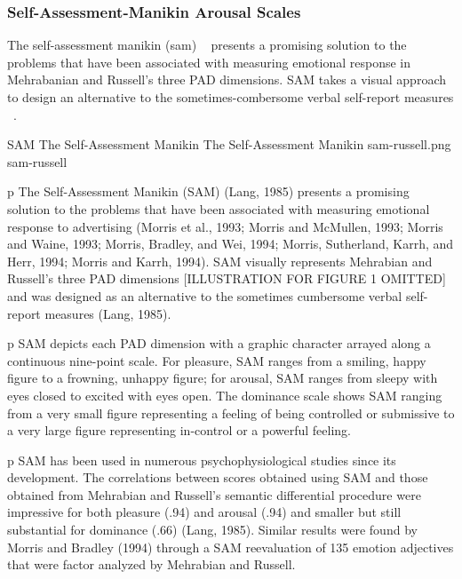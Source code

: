 \documentclass{uofsthesis-cs}
\begin{document}
\subsubsection{Self-Assessment-Manikin Arousal Scales}
The self-assessment manikin (sam) ~\cite{lang1985cognitive} presents a promising solution to the problems that have been associated with measuring emotional response in Mehrabanian and Russell's three PAD dimensions. SAM takes a visual approach to design an alternative to the sometimes-combersome verbal self-report measures ~\cite{lang1985cognitive}.

\img
{SAM The Self-Assessment Manikin}
{The Self-Assessment Manikin}
{sam-russell.png}
{sam-russell}

p The Self-Assessment Manikin (SAM) (Lang, 1985) presents a promising solution to the problems that have been associated with measuring emotional response to advertising (Morris et al., 1993; Morris and McMullen, 1993; Morris and Waine, 1993; Morris, Bradley, and Wei, 1994; Morris, Sutherland, Karrh, and Herr, 1994; Morris and Karrh, 1994). SAM visually represents Mehrabian and Russell's three PAD dimensions [ILLUSTRATION FOR FIGURE 1 OMITTED] and was designed as an alternative to the sometimes cumbersome verbal self-report measures (Lang, 1985).

p SAM depicts each PAD dimension with a graphic character arrayed along a continuous nine-point scale. For pleasure, SAM ranges from a smiling, happy figure to a frowning, unhappy figure; for arousal, SAM ranges from sleepy with eyes closed to excited with eyes open. The dominance scale shows SAM ranging from a very small figure representing a feeling of being controlled or submissive to a very large figure representing in-control or a powerful feeling.

p SAM has been used in numerous psychophysiological studies since its development. The correlations between scores obtained using SAM and those obtained from Mehrabian and Russell's semantic differential procedure were impressive for both pleasure (.94) and arousal (.94) and smaller but still substantial for dominance (.66) (Lang, 1985). Similar results were found by Morris and Bradley (1994) through a SAM reevaluation of 135 emotion adjectives that were factor analyzed by Mehrabian and Russell.
\end{document}
